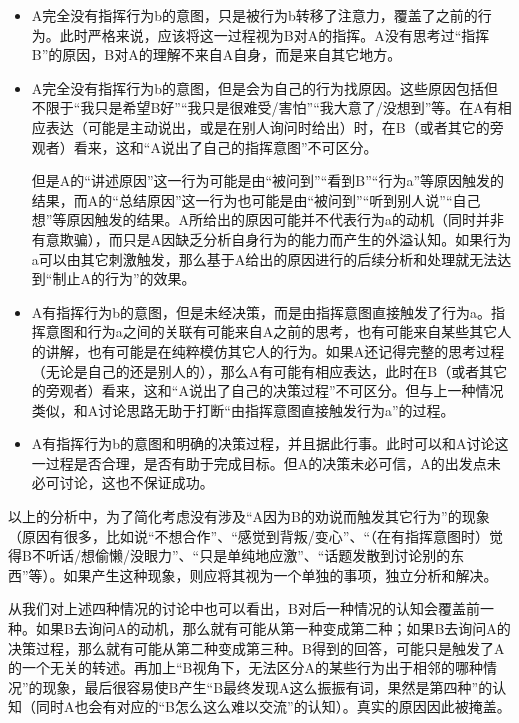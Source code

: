 \begin{explain}
\begin{itemize}
\item A完全没有指挥行为b的意图，只是被行为b转移了注意力，覆盖了之前的行为。此时严格来说，应该将这一过程视为B对A的指挥。A没有思考过“指挥B”的原因，B对A的理解不来自A自身，而是来自其它地方。%
\item A完全没有指挥行为b的意图，但是会为自己的行为找原因。这些原因包括但不限于“我只是希望B好”“我只是很难受/害怕”“我大意了/没想到”等。在A有相应表达（可能是主动说出，或是在别人询问时给出）时，在B（或者其它的旁观者）看来，这和“A说出了自己的指挥意图”不可区分。

但是A的“讲述原因”这一行为可能是由“被问到”“看到B”“行为a”等原因触发的结果，而A的“总结原因”这一行为也可能是由“被问到”“听到别人说”“自己想”等原因触发的结果。A所给出的原因可能并不代表行为a的动机（同时并非有意欺骗），而只是A因缺乏分析自身行为的能力而产生的外溢认知。如果行为a可以由其它刺激触发，那么基于A给出的原因进行的后续分析和处理就无法达到“制止A的行为”的效果。
\item A有指挥行为b的意图，但是未经决策，而是由指挥意图直接触发了行为a。指挥意图和行为a之间的关联有可能来自A之前的思考，也有可能来自某些其它人的讲解，也有可能是在纯粹模仿其它人的行为。如果A还记得完整的思考过程（无论是自己的还是别人的），那么A有可能有相应表达，此时在B（或者其它的旁观者）看来，这和“A说出了自己的决策过程”不可区分。但与上一种情况类似，和A讨论思路无助于打断“由指挥意图直接触发行为a”的过程。
\item A有指挥行为b的意图和明确的决策过程，并且据此行事。此时可以和A讨论这一过程是否合理，是否有助于完成目标。但A的决策未必可信，A的出发点未必可讨论，这也不保证成功。
\end{itemize}
以上的分析中，为了简化考虑没有涉及“A因为B的劝说而触发其它行为”的现象（原因有很多，比如说“不想合作”、“感觉到背叛/变心”、“（在有指挥意图时）觉得B不听话/想偷懒/没眼力”、“只是单纯地应激”、“话题发散到讨论别的东西”等）。如果产生这种现象，则应将其视为一个单独的事项，独立分析和解决。

从我们对上述四种情况的讨论中也可以看出，B对后一种情况的认知会覆盖前一种。如果B去询问A的动机，那么就有可能从第一种变成第二种；如果B去询问A的决策过程，那么就有可能从第二种变成第三种。B得到的回答，可能只是触发了A的一个无关的转述。再加上“B视角下，无法区分A的某些行为出于相邻的哪种情况”的现象，最后很容易使B产生“B最终发现A这么振振有词，果然是第四种”的认知（同时A也会有对应的“B怎么这么难以交流”的认知）。真实的原因因此被掩盖。
\end{explain}
